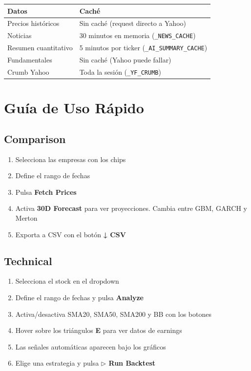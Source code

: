 \documentclass[11pt, a4paper]{article}
\newcommand{\code}[1]{\texttt{#1}}
\begin{document}
\begin{center}
\begin{tabular}{ll}
  \toprule
  \textbf{Datos} & \textbf{Caché} \\
  \midrule
  Precios históricos  & Sin caché (request directo a Yahoo) \\
  Noticias            & 30 minutos en memoria (\code{\_NEWS\_CACHE}) \\
  Resumen cuantitativo & 5 minutos por ticker (\code{\_AI\_SUMMARY\_CACHE}) \\
  Fundamentales       & Sin caché (Yahoo puede fallar) \\
  Crumb Yahoo         & Toda la sesión (\code{\_YF\_CRUMB}) \\
  \bottomrule
\end{tabular}
\end{center}

\newpage

\section{Guía de Uso Rápido}

\subsection{Comparison}
\begin{enumerate}
  \item Selecciona las empresas con los chips
  \item Define el rango de fechas
  \item Pulsa \textbf{Fetch Prices}
  \item Activa \textbf{30D Forecast} para ver proyecciones. Cambia entre GBM, GARCH y Merton
  \item Exporta a CSV con el botón \textbf{↓ CSV}
\end{enumerate}

\subsection{Technical}
\begin{enumerate}
  \item Selecciona el stock en el dropdown
  \item Define el rango de fechas y pulsa \textbf{Analyze}
  \item Activa/desactiva SMA20, SMA50, SMA200 y BB con los botones
  \item Hover sobre los triángulos \textbf{E} para ver datos de earnings
  \item Las señales automáticas aparecen bajo los gráficos
  \item Elige una estrategia y pulsa \textbf{$\triangleright$ Run Backtest}
\end{enumerate}
\end{document}
